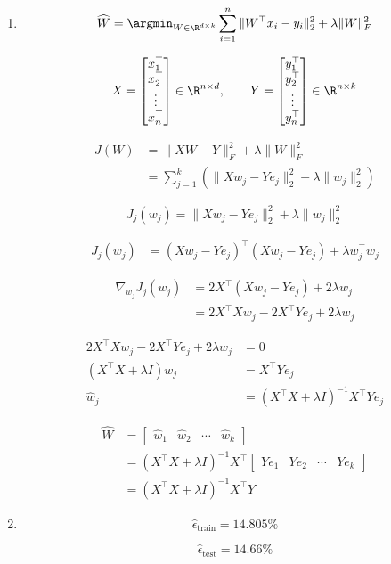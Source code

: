 \documentclass[fleqn]{article}
\begin{document}
\begin{enumerate}[label=(\alph*)]
\item
\[
\widehat{W}
= \argmin_{W \in \R^{d \times k}}
\sum_{i=1}^{n} \|W^\top x_i - y_i\|_2^2 + \lambda \|W\|_F^2
\]

\[
X =
\begin{bmatrix}
x_1^\top \\
x_2^\top \\
\vdots \\
x_n^\top
\end{bmatrix}
\in \R^{n \times d},
\qquad
Y =
\begin{bmatrix}
y_1^\top \\
y_2^\top \\
\vdots \\
y_n^\top
\end{bmatrix}
\in \R^{n \times k}
\]

\begin{align*}
J(W)
&= \|XW - Y\|_F^2 + \lambda\|W\|_F^2 \\
&= \sum_{j=1}^{k}\left(\|Xw_j - Ye_j\|_2^2 + \lambda\|w_j\|_2^2\right)
\end{align*}

\[
J_j(w_j) = \|Xw_j - Ye_j\|_2^2 + \lambda\|w_j\|_2^2
\]

\begin{align*}
J_j(w_j)
&= (Xw_j - Ye_j)^\top(Xw_j - Ye_j) + \lambda w_j^\top w_j
\end{align*}

\begin{align*}
\nabla_{w_j} J_j(w_j)
&= 2X^\top(Xw_j - Ye_j) + 2\lambda w_j \\
&= 2X^\top Xw_j - 2X^\top Ye_j + 2\lambda w_j
\end{align*}

\begin{align*}
2X^\top Xw_j - 2X^\top Ye_j + 2\lambda w_j &= 0 \\
(X^\top X + \lambda I)w_j &= X^\top Ye_j \\
\widehat{w}_j &= (X^\top X + \lambda I)^{-1}X^\top Ye_j
\end{align*}

\begin{align*}
\widehat{W}
&= \begin{bmatrix}
\widehat{w}_1 & \widehat{w}_2 & \cdots & \widehat{w}_k
\end{bmatrix} \\
&= (X^\top X + \lambda I)^{-1}X^\top
\begin{bmatrix}
Ye_1 & Ye_2 & \cdots & Ye_k
\end{bmatrix} \\
&= (X^\top X + \lambda I)^{-1}X^\top Y
\end{align*}

\item

\[
\widehat{\epsilon}_{\textrm{train}} = 14.805\%
\]

\[
\widehat{\epsilon}_{\textrm{test}} = 14.66\%
\]
\end{enumerate}


\end{document}
